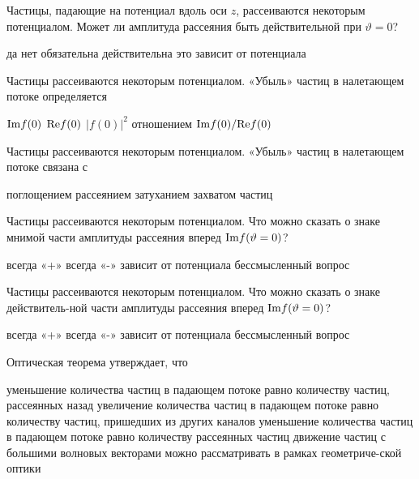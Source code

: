 \documentclass[11pt,a4paper]{exam}
\begin{document}
\begin{questions}
\question Частицы, падающие на потенциал вдоль оси $z$, рассеиваются некоторым потенциалом. Может ли амплитуда рассеяния быть действительной при $\vartheta  = 0$?
\begin{choices}
\choice да             
\choice нет
\choice обязательна действительна  
\choice это зависит от потенциала
\end{choices}

\question Частицы рассеиваются некоторым потенциалом. «Убыль» частиц  в налетающем потоке определяется
\begin{choices}
\choice ${\mathop{\rm Im}\nolimits} f(0)$      
\choice ${\mathop{\rm Re}\nolimits} f(0)$      
\choice $|f(0){|^2}$      
\choice отношением ${\mathop{\rm Im}\nolimits} f(0)/{\mathop{\rm Re}\nolimits} f(0)$
\end{choices}

\question Частицы рассеиваются некоторым потенциалом. «Убыль» частиц  в налетающем потоке связана с
\begin{choices}
\choice поглощением 
\choice рассеянием     
\choice затуханием  
\choice захватом частиц
\end{choices}

\question Частицы рассеиваются некоторым потенциалом. Что можно сказать о знаке мнимой части амплитуды рассеяния вперед ${\mathop{\rm Im}\nolimits} f(\vartheta  = 0)$?
\begin{choices}
\choice всегда «+»           
\choice всегда «-»
\choice зависит от потенциала      
\choice бессмысленный вопрос
\end{choices}

\question Частицы рассеиваются некоторым потенциалом. Что можно сказать о знаке действитель-ной части амплитуды рассеяния вперед ${\mathop{\rm Im}\nolimits} f(\vartheta  = 0)$?
\begin{choices}
\choice всегда «+»           
\choice всегда «-»
\choice зависит от потенциала      
\choice бессмысленный вопрос
\end{choices}

\question Оптическая теорема утверждает, что
\begin{choices}
\choice уменьшение количества частиц в падающем потоке равно количеству частиц, рассеянных назад
\choice увеличение количества частиц в падающем потоке равно количеству частиц, пришедших из других каналов
\choice уменьшение количества частиц в падающем потоке равно количеству рассеянных частиц
\choice движение частиц с большими волновых векторами можно рассматривать в рамках геометриче-ской оптики
\end{choices}


\end{questions}
\end{document}
